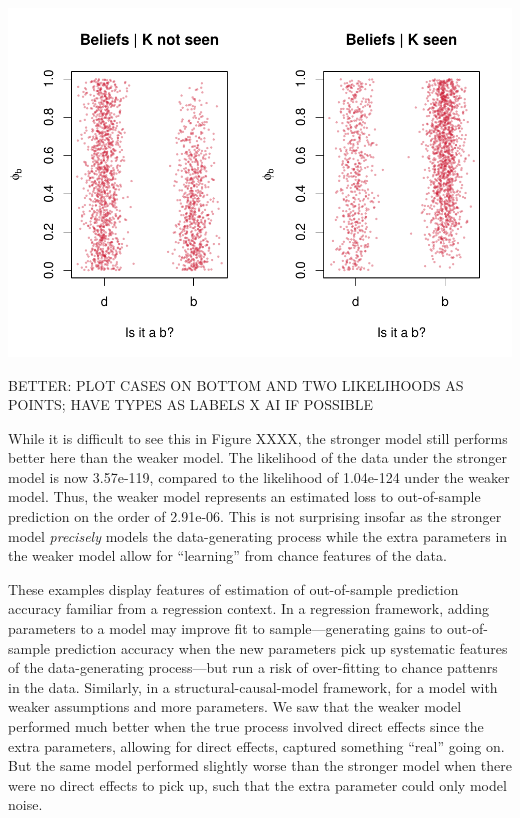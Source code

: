 \documentclass[
  12pt,
]{book}
\begin{document}
\includegraphics{ii_files/figure-latex/unnamed-chunk-23-1.pdf}

BETTER: PLOT CASES ON BOTTOM AND TWO LIKELIHOODS AS POINTS; HAVE TYPES AS LABELS X AI IF POSSIBLE

While it is difficult to see this in Figure XXXX, the stronger model still performs better here than the weaker model. The likelihood of the data under the stronger model is now 3.57e-119, compared to
the likelihood of 1.04e-124 under the weaker model. Thus, the weaker model represents an estimated loss to out-of-sample prediction on the order of 2.91e-06. This is not surprising insofar as the stronger model \emph{precisely} models the data-generating process while the extra parameters in the weaker model allow for ``learning'' from chance features of the data.

These examples display features of estimation of out-of-sample prediction accuracy familiar from a regression context. In a regression framework, adding parameters to a model may improve fit to sample---generating gains to out-of-sample prediction accuracy when the new parameters pick up systematic features of the data-generating process---but run a risk of over-fitting to chance pattenrs in the data. Similarly, in a structural-causal-model framework, for a model with weaker assumptions and more parameters. We saw that the weaker model performed much better when the true process involved direct effects since the extra parameters, allowing for direct effects, captured something ``real'' going on. But the same model performed slightly worse than the stronger model when there were no direct effects to pick up, such that the extra parameter could only model noise.
\end{document}

